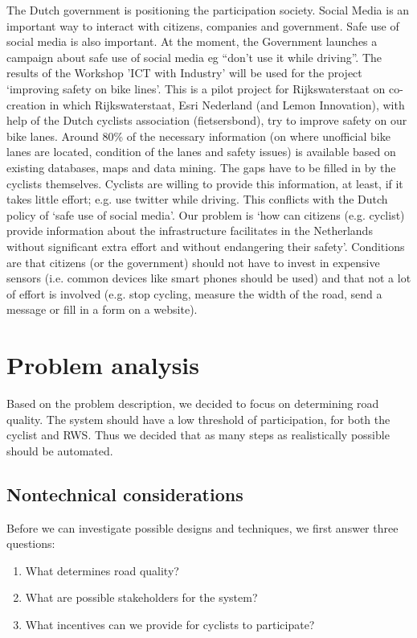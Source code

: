 \documentclass[a4paper,11pt]{article}
\begin{document}
The Dutch government is positioning the participation society. Social Media is an important way to interact with citizens, companies and government. Safe use of social media is also important. At the moment, the Government launches a campaign about safe use of social media eg ``don't use it while driving''.
The results of the Workshop 'ICT with Industry' will be used for the project `improving safety on bike lines'. This is a pilot project for Rijkswaterstaat on co-creation in which Rijkswaterstaat, Esri Nederland (and Lemon Innovation), with help of the Dutch cyclists association (fietsersbond), try to improve safety on our bike lanes. Around 80\% of the necessary information (on where unofficial bike lanes are located, condition of the lanes and safety issues) is available based on existing databases, maps and data mining. The gaps have to be filled in by the cyclists themselves. Cyclists are willing to provide this information, at least, if it takes little effort; e.g. use twitter while driving. This conflicts with the Dutch policy of `safe use of social media'.
Our problem is `how can citizens (e.g. cyclist) provide information about the infrastructure facilitates in the Netherlands without significant extra effort and without endangering their safety'.
Conditions are that citizens (or the government) should not have to invest in expensive sensors (i.e. common devices like smart phones should be used) and that not a lot of effort is involved (e.g. stop cycling, measure the width of the road, send a message or fill in a form on a website).

\section{Problem analysis}

Based on the problem description, we decided to focus on determining road quality. The system should have a low threshold of participation, for both the cyclist and RWS.
Thus we decided that as many steps as realistically possible should be automated.

\subsection{Nontechnical considerations}

Before we can investigate possible designs and techniques, we first answer three questions:
\begin{enumerate}\setlength{\itemsep}{-3pt}
\item What determines road quality?
\item What are possible stakeholders for the system?
\item What incentives can we provide for cyclists to participate?
\end{enumerate}
\end{document}
